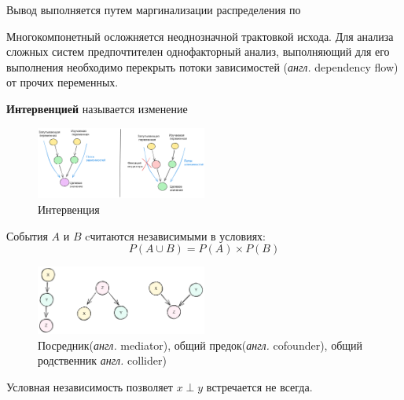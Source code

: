 Вывод выполняется путем маргинализации распределения по 



Многокомпонетный осложняется неоднозначной трактовкой исхода. 
Для анализа сложных систем предпочтителен однофакторный анализ, выполняющий
для его выполнения необходимо перекрыть потоки зависимостей (\textit{англ.} dependency flow) от
прочих переменных.

 \textbf{Интервенцией} называется изменение 

\begin{figure}[h]
    \centering
    \includegraphics[width=0.5\textwidth]{assets/math/discrete/dep_flow.excalidraw.png}
    \caption{Интервенция}
    \label{discr_vs_gen}
\end{figure}

 События $A$ и $B$ cчитаются независимыми в условиях:
\begin{equation}
    P(A \cup B) = P(A) \times P(B)
\end{equation}

\begin{figure}[h]
    \centering
    \includegraphics[width=0.5\textwidth]{assets/math/discrete/bayes_net.excalidraw.png}
    \caption{Посредник(\textit{англ.} mediator), общий предок(\textit{англ.} cofounder), 
 общий родственник \textit{англ.} collider) }
    \label{discr_vs_gen}
\end{figure}




Условная независимость позволяет 
$x \perp y$ встречается не всегда.


